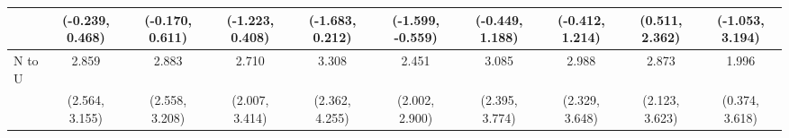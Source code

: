 {\begin{tabular}{l|c|c|c|c|c|c|c|c|c}
& {\scriptsize (-0.239, 0.468)}
& {\scriptsize (-0.170, 0.611)}
& {\scriptsize (-1.223, 0.408)}
& {\scriptsize (-1.683, 0.212)}
& {\scriptsize (-1.599, -0.559)}
& {\scriptsize (-0.449, 1.188)}
& {\scriptsize (-0.412, 1.214)}
& {\scriptsize (0.511, 2.362)}
& {\scriptsize (-1.053, 3.194)}
\\ [0.1cm]
\hline
N to U
& 2.859 & 2.883 & 2.710 & 3.308 & 2.451 & 3.085 & 2.988 & 2.873 & 1.996 \\
& {\scriptsize (2.564, 3.155)}
& {\scriptsize (2.558, 3.208)}
& {\scriptsize (2.007, 3.414)}
& {\scriptsize (2.362, 4.255)}
& {\scriptsize (2.002, 2.900)}
& {\scriptsize (2.395, 3.774)}
& {\scriptsize (2.329, 3.648)}
& {\scriptsize (2.123, 3.623)}
& {\scriptsize (0.374, 3.618)}
\\ [0.1cm]
\hline
\hline
\end{tabular}
}
